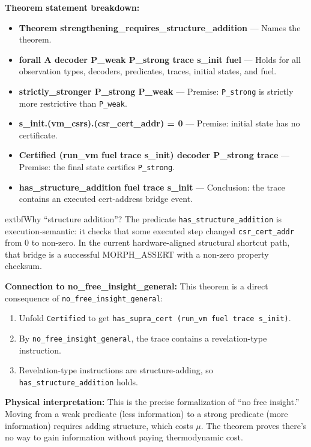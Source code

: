 \textbf{Theorem statement breakdown:}
\begin{itemize}
    \item \textbf{Theorem strengthening\_requires\_structure\_addition} — Names the theorem.
    \item \textbf{forall A decoder P\_weak P\_strong trace s\_init fuel} — Holds for all observation types, decoders, predicates, traces, initial states, and fuel.
    \item \textbf{strictly\_stronger P\_strong P\_weak} — Premise: \texttt{P\_strong} is strictly more restrictive than \texttt{P\_weak}.
    \item \textbf{s\_init.(vm\_csrs).(csr\_cert\_addr) = 0} — Premise: initial state has no certificate.
    \item \textbf{Certified (run\_vm fuel trace s\_init) decoder P\_strong trace} — Premise: the final state certifies \texttt{P\_strong}.
    \item \textbf{has\_structure\_addition fuel trace s\_init} — Conclusion: the trace contains an executed cert-address bridge event.
\end{itemize}

  	extbf{Why ``structure addition''?} The predicate \texttt{has\_structure\_addition} is execution-semantic: it checks that some executed step changed \texttt{csr\_cert\_addr} from 0 to non-zero. In the current hardware-aligned structural shortcut path, that bridge is a successful MORPH\_ASSERT with a non-zero property checksum.

\textbf{Connection to no\_free\_insight\_general:} This theorem is a direct consequence of \texttt{no\_free\_insight\_general}:
\begin{enumerate}
    \item Unfold \texttt{Certified} to get \texttt{has\_supra\_cert (run\_vm fuel trace s\_init)}.
    \item By \texttt{no\_free\_insight\_general}, the trace contains a revelation-type instruction.
    \item Revelation-type instructions are structure-adding, so \texttt{has\_structure\_addition} holds.
\end{enumerate}

\textbf{Physical interpretation:} This is the precise formalization of ``no free insight.'' Moving from a weak predicate (less information) to a strong predicate (more information) requires adding structure, which costs $\mu$. The theorem proves there's no way to gain information without paying thermodynamic cost.

